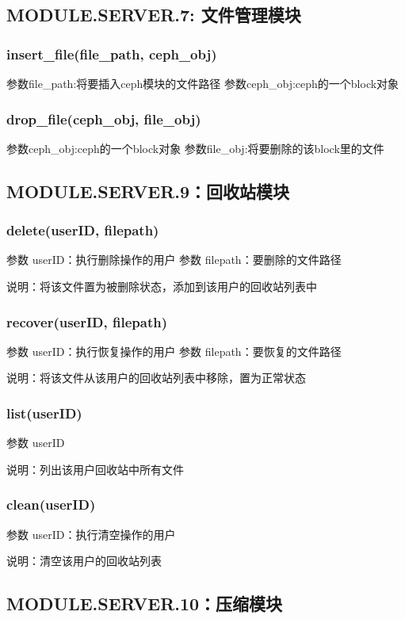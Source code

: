\subsection{MODULE.SERVER.7: 文件管理模块}

\subsubsection{insert\_file(file\_path, ceph\_obj)}
参数file\_path:将要插入ceph模块的文件路径
参数ceph\_obj:ceph的一个block对象

\subsubsection{drop\_file(ceph\_obj, file\_obj)}
参数ceph\_obj:ceph的一个block对象
参数file\_obj:将要删除的该block里的文件


\subsection{MODULE.SERVER.9：回收站模块}

\subsubsection{delete(userID, filepath)}
参数 userID：执行删除操作的用户
参数 filepath：要删除的文件路径

说明：将该文件置为被删除状态，添加到该用户的回收站列表中

\subsubsection{recover(userID, filepath)}
参数 userID：执行恢复操作的用户
参数 filepath：要恢复的文件路径

说明：将该文件从该用户的回收站列表中移除，置为正常状态

\subsubsection{list(userID)}
参数 userID

说明：列出该用户回收站中所有文件

\subsubsection{clean(userID)}
参数 userID：执行清空操作的用户

说明：清空该用户的回收站列表

\subsection{MODULE.SERVER.10：压缩模块}
